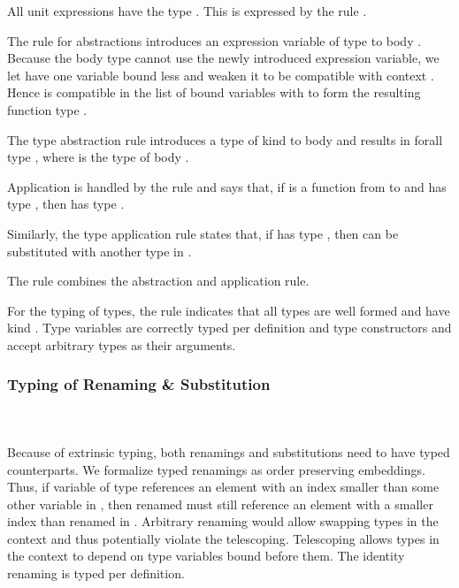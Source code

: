 \noindent All unit expressions  have the type . This is expressed by the rule .

\noindent The rule for abstractions  introduces an expression variable of type  to body . 
Because the body type  cannot use the newly introduced expression variable, we let  have one variable bound less and weaken it to be compatible with context   . 
Hence  is compatible in the list of bound variables with  to form the resulting function type   . 

\noindent The type abstraction rule  introduces a type of kind  to body  and results in forall type  , where  is the type of body . 

\noindent Application is handled by the rule  and says that, if  is a function from  to  and  has type , then    has type . 

\noindent Similarly, the type application rule  states that, if  has type  , then  can be substituted with another type  in . 

\noindent The rule  combines the abstraction and application rule.

\noindent For the typing of types, the rule  indicates that all types  are well formed and have kind . Type variables are correctly typed per definition and type constructors  and  accept arbitrary types as their arguments.

\subsubsection{Typing of Renaming \& Substitution}\hfill\\\\
Because of extrinsic typing, both renamings and substitutions need to have typed counterparts.
We formalize typed renamings  as order preserving embeddings. 
Thus, if variable  of type    references an element with an index smaller than some other variable  in , then renamed  must still reference an element with a smaller index than renamed  in .
Arbitrary renaming would allow swapping types in the context and thus potentially violate the telescoping. 
Telescoping allows types in the context to depend on type variables bound before them.
\FRenTyping
The identity renaming  is typed per definition. 

